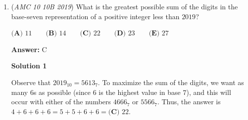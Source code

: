 \begin{enumerate}
Let $b_1$, $g_1$, $b_2$, $g_2$, represent the amount of blue marbles in jar 1, the amount of green marbles in jar 1, the the amount of blue marbles in jar 2, and the amount of green marbles in jar 2, respectively. We now have the equations, $\frac{b_1}{g_1} = \frac{9}{1}$, $\frac{b_2}{g_2} = \frac{8}{1}$, $g_1 + g_2 =95$, and $b_1 + g_1 = b_2 + g_2$.Since $b_1 = 9g_1$ and $b_2 = 8g_2$, we substitute that in to obtain $10g_1 = 9g_2$. Coupled with our third equation, we find that $g_1 = 45$, and that $g_2 = 50$. We now use this information to find $b_1 = 405$and $b_2 = 400$. 

 Therefore, $b_1 - b_2 = 5$ so our answer is $\boxed{\textbf{(A) } 5}$.~Binderclips1

 



\textbf{Solution 4}

Writing out to ratios, we have $9:1$ in jar $1$ and $8:1$ in jar $2$. Since the jar must have to same amount of marbles, let's make a variable $a$ and $b$ for each of the ratios to be multiplied by. Now we would have $9a + a = 8b + b \rightarrow 10a = 9b$. We can take the most obvious values of $a$ and $b$ and then scale it from there. We should be able to see that $a$ and $b$ could be $9$ and $10$ respectively. Now remember that there are $95$ green marbles or $x(a + b) = 95$ for some integer $x$ to scale it. Substituting and dividing, we find $x = 5$. Thus to find the difference of the blue marbles we must do 
 \begin{align*} x(9a - 8b) &= \\ 5(81 - 80) &= \\ 5(1) &= \boxed{\textbf{(A) }5} \\ \end{align*}




	\item (\textit{AMC 10 10B 2019}) What is the greatest possible sum of the digits in the base-seven representation of a positive integer less than $2019$?


 $\textbf{(A) } 11 \qquad\textbf{(B) } 14 \qquad\textbf{(C) } 22 \qquad\textbf{(D) } 23 \qquad\textbf{(E) } 27$

 \textbf{Answer: }C



\textbf{Solution 1}

Observe that $2019_{10} = 5613_7$. To maximize the sum of the digits, we want as many $6$s as possible (since $6$ is the highest value in base $7$), and this will occur with either of the numbers $4666_7$ or $5566_7$. Thus, the answer is $4+6+6+6 = 5+5+6+6 = \boxed{\textbf{(C) }22}$.


\end{enumerate}
